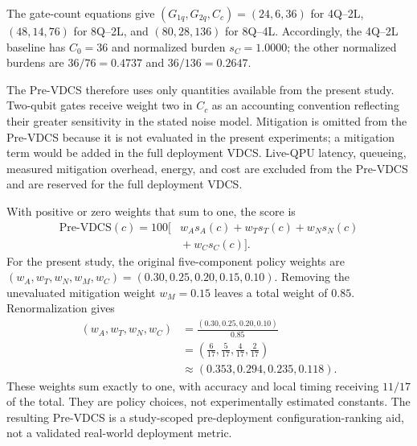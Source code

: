 \documentclass[final,5p,times,number]{elsarticle}
\begin{document}
The gate-count equations give $(G_{1q},G_{2q},C_c)=(24,6,36)$ for
4Q--2L, $(48,14,76)$ for 8Q--2L, and $(80,28,136)$ for 8Q--4L.
Accordingly, the 4Q--2L baseline has $C_0=36$ and normalized burden
$s_C=1.0000$; the other normalized burdens are $36/76=0.4737$ and
$36/136=0.2647$.

The Pre-VDCS therefore uses only quantities available from the present
study. Two-qubit gates receive weight two in $C_c$ as an accounting
convention reflecting their greater sensitivity in the stated noise
model. Mitigation is omitted from the Pre-VDCS because it is not
evaluated in the present experiments; a mitigation term would be added
in the full deployment VDCS. Live-QPU latency, queueing,
measured mitigation overhead, energy, and cost are excluded from the
Pre-VDCS and are reserved for the full deployment VDCS.

With positive or zero weights that sum to one, the score is
\begin{equation}
  \begin{aligned}
    \mathrm{Pre\text{-}VDCS}(c)=100\bigl[&w_A s_A(c)+w_Ts_T(c)+w_Ns_N(c)\\[-1pt]
                              &{}+w_Cs_C(c)\bigr].
  \end{aligned}
  \label{eq:vdcs}
\end{equation}
For the present study, the original five-component policy weights are
$(w_A,w_T,w_N,w_M,w_C)=(0.30,0.25,0.20,0.15,0.10)$. Removing the
unevaluated mitigation weight $w_M=0.15$ leaves a total weight of $0.85$.
Renormalization gives
\[
  \begin{aligned}
    (w_A,w_T,w_N,w_C)
      &=\frac{(0.30,0.25,0.20,0.10)}{0.85}\\
      &=\left(\frac{6}{17},\frac{5}{17},\frac{4}{17},\frac{2}{17}\right)\\
      &\approx(0.353,0.294,0.235,0.118).
  \end{aligned}
\]
These weights sum exactly to one, with accuracy and local timing receiving
$11/17$ of the total. They are policy choices, not experimentally
estimated constants. The resulting Pre-VDCS is a study-scoped
pre-deployment configuration-ranking aid, not a validated real-world
deployment metric.


\end{document}
